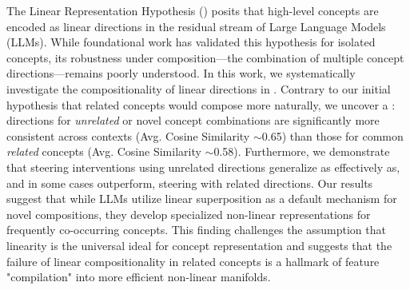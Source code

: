 The Linear Representation Hypothesis (\lrh) posits that high-level concepts are encoded as linear directions in the residual stream of Large Language Models (LLMs). While foundational work has validated this hypothesis for isolated concepts, its robustness under composition---the combination of multiple concept directions---remains poorly understood. In this work, we systematically investigate the compositionality of linear directions in \qwen. Contrary to our initial hypothesis that related concepts would compose more naturally, we uncover a \textbf{\consistencyparadox}: directions for \textit{unrelated} or novel concept combinations are significantly more consistent across contexts (Avg. Cosine Similarity $\sim$0.65) than those for common \textit{related} concepts (Avg. Cosine Similarity $\sim$0.58). Furthermore, we demonstrate that steering interventions using unrelated directions generalize as effectively as, and in some cases outperform, steering with related directions. Our results suggest that while LLMs utilize linear superposition as a default mechanism for novel compositions, they develop specialized non-linear representations for frequently co-occurring concepts. This finding challenges the assumption that linearity is the universal ideal for concept representation and suggests that the failure of linear compositionality in related concepts is a hallmark of feature "compilation" into more efficient non-linear manifolds.
